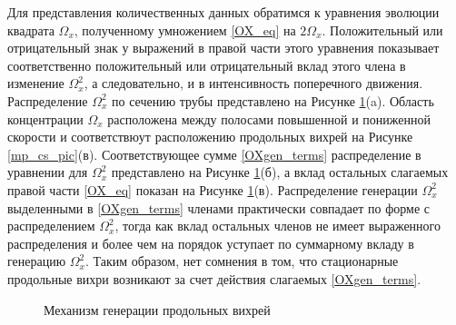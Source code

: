 Для представления количественных данных обратимся к уравнения эволюции квадрата $\Omega_x$, полученному умножением \eqref{OX_eq} на $2\Omega_x$. Положительный или отрицательный знак у выражений в правой части этого уравнения показывает соответственно положительный или отрицательный вклад этого члена в изменение $\Omega^2_x$, а следовательно, и в интенсивность поперечного движения. Распределение $\Omega^2_x$ по сечению трубы представлено на Рисунке \ref{OXgen_pic}(a). Область концентрации $\Omega_x$ расположена между полосами повышенной и пониженной скорости и соответствюут расположению продольных вихрей на Рисунке \ref{mp_cs_pic}(в). Соответствующее сумме \eqref{OXgen_terms} распределение в уравнении для $\Omega^2_x$ представлено на Рисунке \ref{OXgen_pic}(б), а вклад остальных слагаемых правой части \eqref{OX_eq} показан на Рисунке \ref{OXgen_pic}(в). Распределение генерации $\Omega^2_x$ выделенными в \eqref{OXgen_terms} членами практически совпадает по форме с распределением $\Omega^2_x$, тогда как вклад остальных членов не имеет выраженного распределения и более чем на порядок уступает по суммарному вкладу в генерацию $\Omega^2_x$. Таким образом, нет сомнения в том, что стационарные продольные вихри возникают за счет действия слагаемых \eqref{OXgen_terms}.

\begin{figure}
\caption{Механизм генерации продольных вихрей}
\label{OXgen_pic}
\end{figure}

